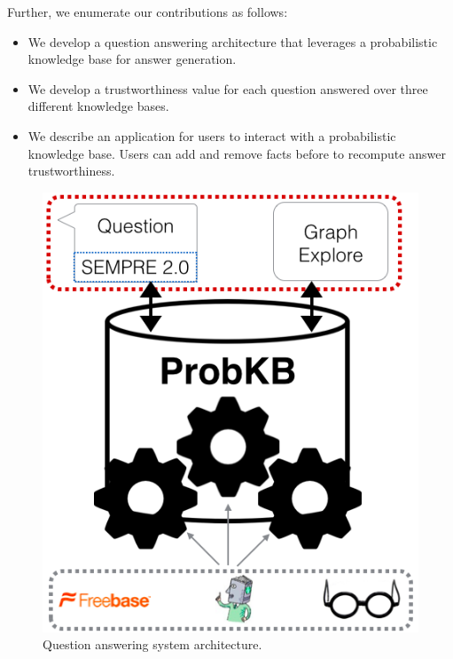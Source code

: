 Further, we enumerate our contributions as follows:
\begin{itemize}[noitemsep,topsep=2pt,parsep=2pt,partopsep=0pt,
                leftmargin=10pt,labelindent=0pt,itemindent=0pt]
\item We develop a question answering architecture that leverages a probabilistic knowledge base for answer generation.

\item We develop a trustworthiness value for each question answered over three
  different knowledge bases.

\item We describe an application for users to interact with a probabilistic knowledge
base. Users can add and remove facts before to recompute answer
trustworthiness.
\end{itemize}

\begin{figure}
\centering
\includegraphics[width=0.6\columnwidth]{images/probqa-architecture.png}
\caption{Question answering system architecture.}
\label{fig:qaarchitecture}
\end{figure}

